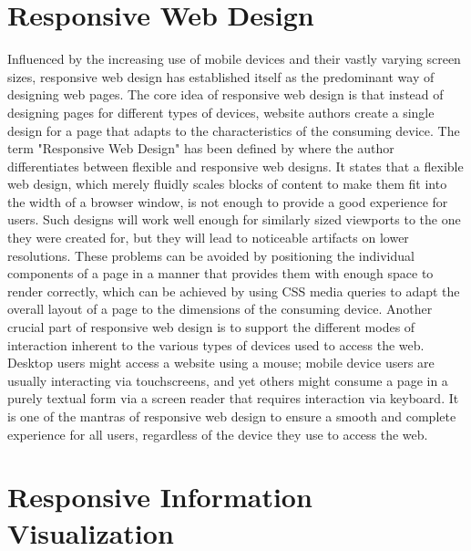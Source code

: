 \section{Responsive Web Design}

Influenced by the increasing use of mobile devices and their vastly varying screen sizes, responsive web design has established itself as the predominant way of designing web pages. The core idea of responsive web design is that instead of designing pages for different types of devices, website authors create a single design for a page that adapts to the characteristics of the consuming device. The term "Responsive Web Design" has been defined by \cite{ResponsiveWebDesign} where the author differentiates between flexible and responsive web designs. It states that a flexible web design, which merely fluidly scales blocks of content to make them fit into the width of a browser window, is not enough to provide a good experience for users. Such designs will work well enough for similarly sized viewports to the one they were created for, but they will lead to noticeable artifacts on lower resolutions. These problems can be avoided by positioning the individual components of a page in a manner that provides them with enough space to render correctly, which can be achieved by using CSS media queries to adapt the overall layout of a page to the dimensions of the consuming device. Another crucial part of responsive web design is to support the different modes of interaction inherent to the various types of devices used to access the web. Desktop users might access a website using a mouse; mobile device users are usually interacting via touchscreens, and yet others might consume a page in a purely textual form via a screen reader that requires interaction via keyboard. It is one of the mantras of responsive web design to ensure a smooth and complete experience for all users, regardless of the device they use to access the web. 

\section{Responsive Information Visualization}

 

   

